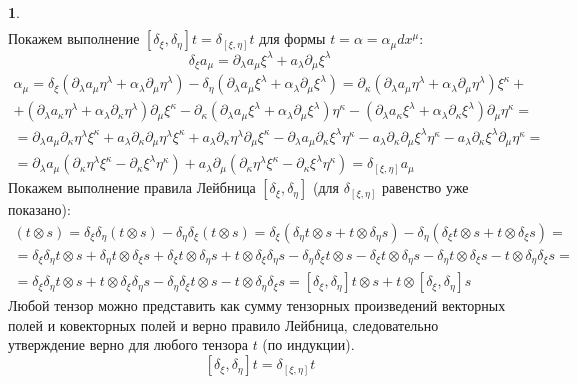 \documentclass[12pt]{article}
\theoremstyle{definition}
\newtheorem{zad}{}[section]
\begin{document}
\begin{zad}
\begin{multline}
\end{multline}
Покажем выполнение $[\delta_\xi,\delta_\eta]t=\delta_{[\xi,\eta]}t$ для формы $t=\alpha=\alpha_\mu dx^\mu$:
\begin{equation}
    \delta_\xi a_\mu=\partial_\lambda a_\mu\xi^\lambda+a_\lambda\partial_\mu\xi^\lambda
\end{equation}
\begin{multline}
    [\delta_\xi,\delta_\eta]\alpha_\mu=\delta_\xi(\partial_\lambda a_\mu\eta^\lambda+\alpha_\lambda\partial_\mu\eta^\lambda)-\delta_\eta(\partial_\lambda a_\mu\xi^\lambda+\alpha_\lambda\partial_\mu\xi^\lambda)=\partial_\kappa(\partial_\lambda a_\mu\eta^\lambda+\alpha_\lambda\partial_\mu\eta^\lambda)\xi^\kappa+\\+(\partial_\lambda a_\kappa\eta^\lambda+\alpha_\lambda\partial_\kappa\eta^\lambda)\partial_\mu\xi^\kappa-\partial_\kappa(\partial_\lambda a_\mu\xi^\lambda+\alpha_\lambda\partial_\mu\xi^\lambda)\eta^\kappa-(\partial_\lambda a_\kappa\xi^\lambda+\alpha_\lambda\partial_\kappa\xi^\lambda)\partial_\mu\eta^\kappa=\\=\partial_\lambda a_\mu\partial_\kappa\eta^\lambda\xi^\kappa+a_\lambda\partial_\kappa\partial_\mu\eta^\lambda\xi^\kappa+a_\lambda\partial_\kappa\eta^\lambda\partial_\mu\xi^\kappa-\partial_\lambda a_\mu\partial_\kappa\xi^\lambda\eta^\kappa-a_\lambda\partial_\kappa\partial_\mu\xi^\lambda\eta^\kappa-a_\lambda\partial_\kappa\xi^\lambda\partial_\mu\eta^\kappa=\\=\partial_\lambda a_\mu(\partial_\kappa\eta^\lambda\xi^\kappa-\partial_\kappa\xi^\lambda\eta^\kappa)+a_\lambda\partial_\mu(\partial_\kappa\eta^\lambda\xi^\kappa-\partial_\kappa\xi^\lambda\eta^\kappa)=\delta_{[\xi,\eta]}a_\mu
\end{multline}
Покажем выполнение правила Лейбница $[\delta_\xi,\delta_\eta]$ (для $\delta_{[\xi,\eta]}$ равенство уже показано):
\begin{multline}
    [\delta_\xi,\delta_\eta](t\otimes s)=\delta_\xi\delta_\eta(t\otimes s)-\delta_\eta\delta_\xi(t\otimes s)=\delta_\xi(\delta_\eta t\otimes s+t\otimes\delta_\eta s)-\delta_\eta(\delta_\xi t\otimes s+t\otimes\delta_\xi s)=\\=\delta_\xi\delta_\eta t\otimes s+\delta_\eta t\otimes\delta_\xi s+\delta_\xi t\otimes\delta_\eta s+t\otimes\delta_\xi\delta_\eta s-\delta_\eta\delta_\xi t\otimes s-\delta_\xi t\otimes\delta_\eta s-\delta_\eta t\otimes\delta_\xi s-t\otimes\delta_\eta\delta_\xi s=\\=\delta_\xi\delta_\eta t\otimes s+t\otimes\delta_\xi\delta_\eta s-\delta_\eta\delta_\xi t\otimes s-t\otimes\delta_\eta\delta_\xi s=[\delta_\xi,\delta_\eta]t\otimes s+t\otimes[\delta_\xi,\delta_\eta]s
\end{multline}
Любой тензор можно представить как сумму тензорных произведений векторных полей и ковекторных полей и верно правило Лейбница, следовательно утверждение верно для любого тензора $t$ (по индукции).
\begin{equation}
    \boxed{[\delta_\xi,\delta_\eta]t=\delta_{[\xi,\eta]}t}
\end{equation}
\end{zad}
\end{document}
